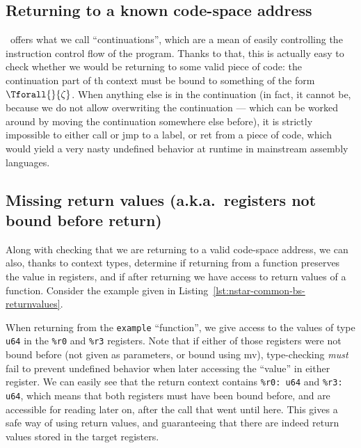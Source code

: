 \subsection{Returning to a known code-space address}\label{subsec:nstar-common-bs-restrictions-ret}

\nstar\ offers what we call ``continuations'', which are a mean of easily controlling the instruction control flow of the program.
Thanks to that, this is actually easy to check whether we would be returning to some valid piece of code: the continuation part of th context must be bound to something of the form $\Tforall{}{\zeta}$.
When anything else is in the continuation (in fact, it cannot be, because we do not allow overwriting the continuation --- which can be worked around by moving the continuation somewhere else before), it is strictly impossible to either {\Iformat call} or {\Iformat jmp} to a label, or {\Iformat ret} from a piece of code, which would yield a very nasty undefined behavior at runtime in mainstream assembly languages.

\subsection{Missing return values (a.k.a.\ registers not bound before return)}\label{subsec:nstar-common-bs-restrictions-unboundregs}

Along with checking that we are returning to a valid code-space address, we can also, thanks to context types, determine if returning from a function preserves the value in registers, and if after returning we have access to return values of a function.
Consider the example given in Listing~\ref{lst:nstar-common-bs-returnvalues}.

When {\Iformat ret}urning from the \texttt{example} ``function'', we give access to the values of type \texttt{u64} in the \texttt{\%r0} and \texttt{\%r3} registers.
Note that if either of those registers were not bound before (not given as parameters, or bound using {\Iformat mv}), type-checking \textit{must} fail to prevent undefined behavior when later accessing the ``value'' in either register.
We can easily see that the return context contains \texttt{\%r0: u64} and \texttt{\%r3: u64}, which means that both registers must have been bound before, and are accessible for reading later on, after the {\Iformat call} that went until here.
This gives a safe way of using return values, and guaranteeing that there are indeed return values stored in the target registers.

